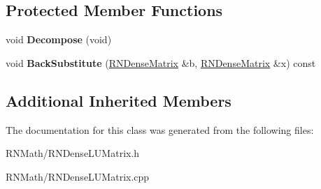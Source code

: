 \subsection*{Protected Member Functions}
\begin{DoxyCompactItemize}
\item 
void {\bfseries Decompose} (void)\hypertarget{class_r_n_dense_l_u_matrix_a93893e013632ce5a73154d57702913dd}{}\label{class_r_n_dense_l_u_matrix_a93893e013632ce5a73154d57702913dd}

\item 
void {\bfseries Back\+Substitute} (\hyperlink{class_r_n_dense_matrix}{R\+N\+Dense\+Matrix} \&b, \hyperlink{class_r_n_dense_matrix}{R\+N\+Dense\+Matrix} \&x) const \hypertarget{class_r_n_dense_l_u_matrix_ae89add12980ac6752a280ec6b992c23a}{}\label{class_r_n_dense_l_u_matrix_ae89add12980ac6752a280ec6b992c23a}

\end{DoxyCompactItemize}
\subsection*{Additional Inherited Members}


The documentation for this class was generated from the following files\+:\begin{DoxyCompactItemize}
\item 
R\+N\+Math/R\+N\+Dense\+L\+U\+Matrix.\+h\item 
R\+N\+Math/R\+N\+Dense\+L\+U\+Matrix.\+cpp\end{DoxyCompactItemize}
